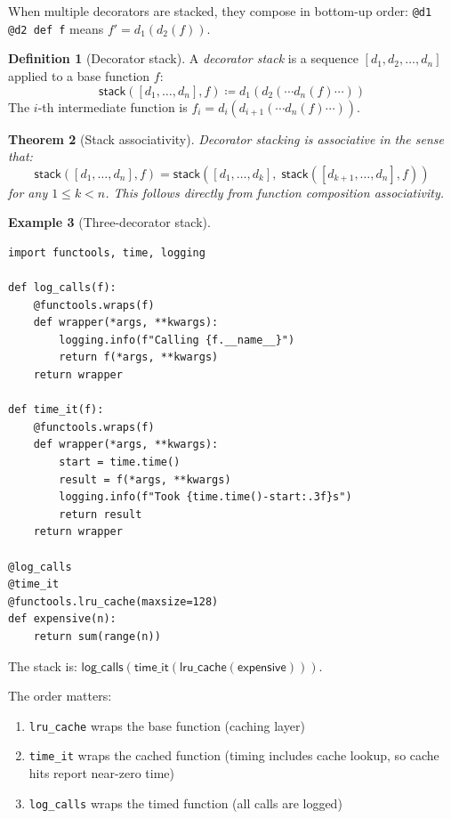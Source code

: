 \documentclass[11pt,a4paper]{report}
\theoremstyle{definition}
\newtheorem{definition}{Definition}[chapter]
\newtheorem{example}[definition]{Example}
\theoremstyle{plain}
\newtheorem{theorem}[definition]{Theorem}
\newcommand{\defeq}{\coloneqq}
\begin{document}
When multiple decorators are stacked, they compose in bottom-up order:
\lstinline[style=python]|@d1 @d2 def f| means $f' = d_1(d_2(f))$.

\begin{definition}[Decorator stack]
A \emph{decorator stack} is a sequence $[d_1, d_2, \ldots, d_n]$ applied to
a base function $f$:
\[
  \mathsf{stack}([d_1, \ldots, d_n], f) \defeq d_1(d_2(\cdots d_n(f) \cdots))
\]
The $i$-th intermediate function is $f_i = d_i(d_{i+1}(\cdots d_n(f) \cdots))$.
\end{definition}

\begin{theorem}[Stack associativity]
\label{thm:stack-assoc}
Decorator stacking is associative in the sense that:
\[
  \mathsf{stack}([d_1, \ldots, d_n], f) =
  \mathsf{stack}([d_1, \ldots, d_k],\; \mathsf{stack}([d_{k+1}, \ldots, d_n], f))
\]
for any $1 \leq k < n$. This follows directly from function composition
associativity.
\end{theorem}

\begin{example}[Three-decorator stack]
\begin{lstlisting}[style=python]
import functools, time, logging

def log_calls(f):
    @functools.wraps(f)
    def wrapper(*args, **kwargs):
        logging.info(f"Calling {f.__name__}")
        return f(*args, **kwargs)
    return wrapper

def time_it(f):
    @functools.wraps(f)
    def wrapper(*args, **kwargs):
        start = time.time()
        result = f(*args, **kwargs)
        logging.info(f"Took {time.time()-start:.3f}s")
        return result
    return wrapper

@log_calls
@time_it
@functools.lru_cache(maxsize=128)
def expensive(n):
    return sum(range(n))
\end{lstlisting}
The stack is: $\mathsf{log\_calls}(\mathsf{time\_it}(\mathsf{lru\_cache}(\mathsf{expensive})))$.

The order matters:
\begin{enumerate}
  \item \texttt{lru\_cache} wraps the base function (caching layer)
  \item \texttt{time\_it} wraps the cached function (timing includes cache
    lookup, so cache hits report near-zero time)
  \item \texttt{log\_calls} wraps the timed function (all calls are logged)
\end{enumerate}
\end{example}
\end{document}
